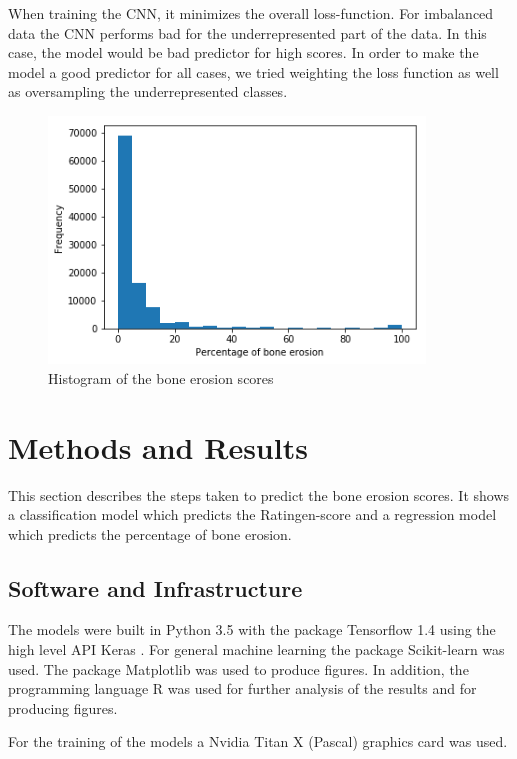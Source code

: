 \documentclass[12pt]{article}
\begin{document}
When training the CNN, it minimizes the overall loss-function. For imbalanced data the CNN performs bad for the underrepresented part of the data. In this case, the model would be bad predictor for high scores. In order to make the model a good predictor for all cases, we tried weighting the loss function as well as oversampling the underrepresented classes.

\begin{figure}[ht]
\includegraphics[width=10cm]{imbalance}	
\caption{Histogram of the bone erosion scores}
\label{fig:imbalance}
\end{figure}

\newpage
\section{Methods and Results}
\label{sec:methods&results}

This section describes the steps taken to predict the bone erosion scores. It shows a classification model which predicts the Ratingen-score and a regression model which predicts the percentage of bone erosion.

\subsection{Software and Infrastructure}
The models were built in Python 3.5 \cite{python} with the package Tensorflow 1.4 \cite{tensorflow} using the high level API Keras \cite{keras}. For general machine learning the package Scikit-learn \cite{scikit-learn} was used. The package Matplotlib \cite{matplotlib} was used to produce figures. In addition, the programming language R \cite{r} was used for further analysis of the results and for producing figures.

For the training of the models a Nvidia Titan X (Pascal) graphics card was used.
\end{document}
